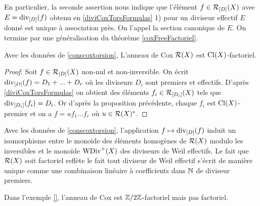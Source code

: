 En particulier, la seconde assertion nous indique que l'élément $f\in \mathcal{R}_{[D]}(X)$ avec $E=\operatorname{div}_{[D]}(f)$ obtenu en \ref{diviCoxTorsFormulas} 1) pour un diviseur effectif $E$ donné est unique à association près. On l'appel la section canonique de $E$. On termine par une généralisation du théorème \ref{coxFreeFactoriel}.

\begin{thm}
Avec les données de \ref{conscoxtorsion}, L'anneau de Cox $\mathcal{R}(X)$ est $\operatorname{Cl}(X)$-factoriel.
\end{thm}
\begin{proof}
Soit $f\in\mathcal{R}_{[D]}(X)$ non-nul et non-inversible. On écrit $\operatorname{div}_{[D]}(f)=D_1+...+D_r$ où les diviseurs $D_i$ sont premiers et effectifs. D'après \ref{diviCoxTorsFormulas} on obtient des éléments $f_i\in\mathcal{R}_{[D_i]}(X)$ tels que $\operatorname{div}_{[D_i]}(f_i)=D_i$. Or d'après la proposition précédente, chaque $f_i$ est $\operatorname{Cl}(X)$-premier et on a $f=uf_1...f_r$ où $u\in\mathcal{R}(X)^*$.
\end{proof}

\begin{rem}
Avec les données de \ref{conscoxtorsion}, l'application $f\mapsto \operatorname{div}_{[D]}(f)$ induit un isomorphisme entre le monoïde des éléments homogènes de $\mathcal{R}(X)$ modulo les inversibles et le monoïde $\operatorname{WDiv}^+(X)$ des diviseurs de Weil effectifs. Le fait que $\mathcal{R}(X)$ soit factoriel reflète le fait tout diviseur de Weil effectif s'écrit de manière unique comme une combinaison linéaire à coefficients dans $\mathbb{N}$ de diviseur premiers.
\end{rem}

\begin{ex}
Dans l'exemple \ref{}, l'anneau de Cox est $\mathbb{Z}/2\mathbb{Z}$-factoriel mais pas factoriel.
\end{ex}

